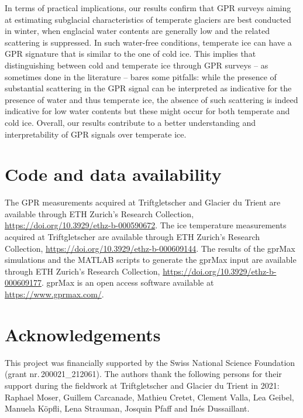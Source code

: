 In terms of practical implications, our results confirm that GPR surveys aiming at estimating subglacial characteristics of temperate glaciers are best conducted in winter, when englacial water contents are generally low and the related scattering is suppressed. In such water-free conditions, temperate ice can have a GPR signature that is similar to the one of cold ice. This implies that distinguishing between cold and temperate ice through GPR surveys -- as sometimes done in the literature -- bares some pitfalls: while the presence of substantial scattering in the GPR signal can be interpreted as indicative for the presence of water and thus temperate ice, the absence of such scattering is indeed indicative for low water contents but these might occur for both temperate and cold ice. Overall, our results contribute to a better understanding and interpretability of GPR signals over temperate ice.


\section{Code and data availability}

The GPR measurements acquired at Triftgletscher and Glacier du Trient are available through ETH Zurich's Research Collection, \url{https://doi.org/10.3929/ethz-b-000590672}. The ice temperature measurements acquired at Triftgletscher are available through ETH Zurich's Research Collection, \url{https://doi.org/10.3929/ethz-b-000609144}. The results of the gprMax simulations and the MATLAB scripts to generate the gprMax input are available through ETH Zurich's Research Collection, \url{https://doi.org/10.3929/ethz-b-000609177}. gprMax is an open access software available at \url{https://www.gprmax.com/}.


\section{Acknowledgements} 

This project was financially supported by the Swiss National Science Foundation (grant nr.\,200021\_212061).
The authors thank the following persons for their support during the fieldwork at Triftgletscher and Glacier du Trient in 2021: Raphael Moser, Guillem Carcanade, Mathieu Cretet, Clement Valla, Lea Geibel, Manuela Köpfli, Lena Strauman, Josquin Pfaff and Inés Dussaillant.
